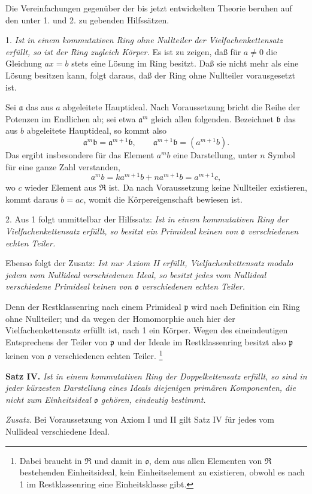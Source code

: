 \documentclass[11pt]{article}
\providecommand{\mR}{\mathfrak{R}}
\providecommand{\ma}{\mathfrak{a}}
\providecommand{\mb}{\mathfrak{b}}
\providecommand{\mo}{\mathfrak{o}}
\providecommand{\mpideal}{\mathfrak{p}}
\begin{document}
Die Vereinfachungen gegenüber der bis jetzt entwickelten Theorie beruhen auf den unter 1. und 2. zu gebenden Hilfssätzen.

1. \emph{Ist in einem kommutativen Ring ohne Nullteiler der Vielfachenkettensatz erfüllt, so ist der Ring zugleich Körper.} Es ist zu zeigen, daß für $a\ne0$ die Gleichung $ax=b$ stets eine Lösung im Ring besitzt. Daß sie nicht mehr als eine Lösung besitzen kann, folgt daraus, daß der Ring ohne Nullteiler vorausgesetzt ist.

Sei $\ma$ das aus $a$ abgeleitete Hauptideal. Nach Voraussetzung bricht die Reihe der Potenzen im Endlichen ab; sei etwa $\ma^m$ gleich allen folgenden. Bezeichnet $\mb$ das aus $b$ abgeleitete Hauptideal, so kommt also
\[
\ma^m\mb=\ma^{m+1}\mb,
\qquad \ma^{m+1}\mb=(a^{m+1}b).
\]
Das ergibt insbesondere für das Element $a^m b$ eine Darstellung, unter $n$ Symbol für eine ganze Zahl verstanden,
\[
 a^m b=k a^{m+1}b+n a^{m+1}b=a^{m+1}c,
\]
wo $c$ wieder Element aus $\mR$ ist. Da nach Voraussetzung keine Nullteiler existieren, kommt daraus $b=ac$, womit die Körpereigenschaft bewiesen ist.

2. Aus 1 folgt unmittelbar der Hilfssatz: \emph{Ist in einem kommutativen Ring der Vielfachenkettensatz erfüllt, so besitzt ein Primideal keinen von $\mo$ verschiedenen echten Teiler.}

Ebenso folgt der Zusatz: \emph{Ist nur Axiom II erfüllt, Vielfachenkettensatz modulo jedem vom Nullideal verschiedenen Ideal, so besitzt jedes vom Nullideal verschiedene Primideal keinen von $\mo$ verschiedenen echten Teiler.}

Denn der Restklassenring nach einem Primideal $\mpideal$ wird nach Definition ein Ring ohne Nullteiler; und da wegen der Homomorphie auch hier der Vielfachenkettensatz erfüllt ist, nach 1 ein Körper. Wegen des eineindeutigen Entsprechens der Teiler von $\mpideal$ und der Ideale im Restklassenring besitzt also $\mpideal$ keinen von $\mo$ verschiedenen echten Teiler.
\footnote{Dabei braucht in $\mR$ und damit in $\mo$, dem aus allen Elementen von $\mR$ bestehenden Einheitsideal, kein Einheitselement zu existieren, obwohl es nach 1 im Restklassenring eine Einheitsklasse gibt.}

\textbf{Satz IV.} \emph{Ist in einem kommutativen Ring der Doppelkettensatz erfüllt, so sind in jeder kürzesten Darstellung eines Ideals diejenigen primären Komponenten, die nicht zum Einheitsideal $\mo$ gehören, eindeutig bestimmt.}

\emph{Zusatz.} Bei Voraussetzung von Axiom I und II gilt Satz IV für jedes vom Nullideal verschiedene Ideal.
\end{document}
